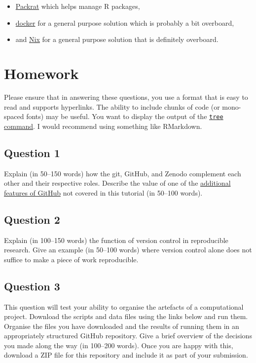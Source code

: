 \documentclass[11pt,onecolumn]{scrartcl}
\begin{document}
\begin{itemize}
\item \href{http://rstudio.github.io/packrat/}{Packrat} which helps manage R packages,
\item \href{https://www.docker.com/}{docker} for a general purpose solution which is probably a bit overboard,
\item and \href{https://nixos.org/}{Nix} for a general purpose solution that is definitely overboard.
\end{itemize}

\section{Homework}
\label{sec:org4891c04}

Please ensure that in answering these questions, you use a format that is easy
to read and supports hyperlinks. The ability to include chunks of code (or
mono-spaced fonts) may be useful. You want to display the output of the \href{https://en.wikipedia.org/wiki/Tree\_(command)}{\texttt{tree}
command}. I would recommend using something like RMarkdown.

\subsection{Question 1}
\label{sec:org1011beb}

Explain (in 50--150 words) how the git, GitHub, and Zenodo complement each other
and their respective roles. Describe the value of one of the \hyperref[sec:org8b5272a]{additional features
of GitHub} not covered in this tutorial (in 50--100 words).

\subsection{Question 2}
\label{sec:org68869e9}

Explain (in 100--150 words) the function of version control in reproducible
research. Give an example (in 50--100 words) where version control alone does
not suffice to make a piece of work reproducible.

\subsection{Question 3}
\label{sec:org4303d57}

This question will test your ability to organise the artefacts of a
computational project. Download the scripts and data files using the links below
and run them. Organise the files you have downloaded and the results of running
them in an appropriately structured GitHub repository. Give a brief overview of
the decisions you made along the way (in 100--200 words). Once you are happy
with this, download a ZIP file for this repository and include it as part of
your submission.
\end{document}
